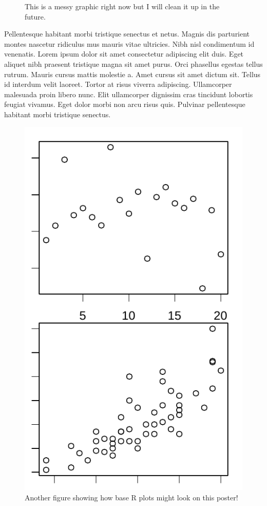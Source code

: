 \documentclass[article,30pt,extrafontsizes]{memoir}
\begin{document}
\begin{multicols*}{3}
{\begin{figure}
{}

\caption{This is a messy graphic right now but I will clean it up in the future.}\label{fig:unnamed-chunk-4}
\end{figure}

Pellentesque habitant morbi tristique senectus et netus. Magnis dis
parturient montes nascetur ridiculus mus mauris vitae ultricies. Nibh
nisl condimentum id venenatis. Lorem ipsum dolor sit amet consectetur
adipiscing elit duis. Eget aliquet nibh praesent tristique magna sit
amet purus. Orci phasellus egestas tellus rutrum. Mauris cursus mattis
molestie a. Amet cursus sit amet dictum sit. Tellus id interdum velit
laoreet. Tortor at risus viverra adipiscing. Ullamcorper malesuada proin
libero nunc. Elit ullamcorper dignissim cras tincidunt lobortis feugiat
vivamus. Eget dolor morbi non arcu risus quis. Pulvinar pellentesque
habitant morbi tristique senectus.

\begin{figure}

{\centering \includegraphics[width=0.65\linewidth]{skeleton_files/figure-latex/unnamed-chunk-5-1} 

}

\caption{Another figure showing how base R plots might look on this poster!}\label{fig:unnamed-chunk-5}
\end{figure}

}
\end{multicols*}
\end{document}
